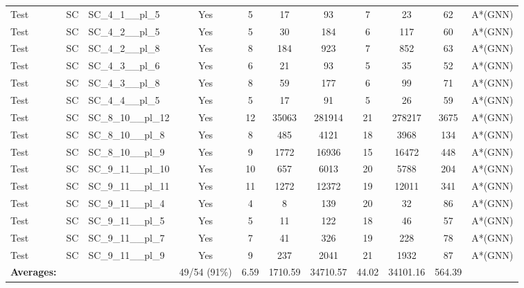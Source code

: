 \documentclass{article}
\begin{document}
\begin{tabular}{lllcccccccc}
Test & SC & SC\_4\_1\_\_pl\_5 & Yes & 5 & 17 & 93 & 7 & 23 & 62 & A*(GNN) \\
Test & SC & SC\_4\_2\_\_pl\_5 & Yes & 5 & 30 & 184 & 6 & 117 & 60 & A*(GNN) \\
Test & SC & SC\_4\_2\_\_pl\_8 & Yes & 8 & 184 & 923 & 7 & 852 & 63 & A*(GNN) \\
Test & SC & SC\_4\_3\_\_pl\_6 & Yes & 6 & 21 & 93 & 5 & 35 & 52 & A*(GNN) \\
Test & SC & SC\_4\_3\_\_pl\_8 & Yes & 8 & 59 & 177 & 6 & 99 & 71 & A*(GNN) \\
Test & SC & SC\_4\_4\_\_pl\_5 & Yes & 5 & 17 & 91 & 5 & 26 & 59 & A*(GNN) \\
Test & SC & SC\_8\_10\_\_pl\_12 & Yes & 12 & 35063 & 281914 & 21 & 278217 & 3675 & A*(GNN) \\
Test & SC & SC\_8\_10\_\_pl\_8 & Yes & 8 & 485 & 4121 & 18 & 3968 & 134 & A*(GNN) \\
Test & SC & SC\_8\_10\_\_pl\_9 & Yes & 9 & 1772 & 16936 & 15 & 16472 & 448 & A*(GNN) \\
Test & SC & SC\_9\_11\_\_pl\_10 & Yes & 10 & 657 & 6013 & 20 & 5788 & 204 & A*(GNN) \\
Test & SC & SC\_9\_11\_\_pl\_11 & Yes & 11 & 1272 & 12372 & 19 & 12011 & 341 & A*(GNN) \\
Test & SC & SC\_9\_11\_\_pl\_4 & Yes & 4 & 8 & 139 & 20 & 32 & 86 & A*(GNN) \\
Test & SC & SC\_9\_11\_\_pl\_5 & Yes & 5 & 11 & 122 & 18 & 46 & 57 & A*(GNN) \\
Test & SC & SC\_9\_11\_\_pl\_7 & Yes & 7 & 41 & 326 & 19 & 228 & 78 & A*(GNN) \\
Test & SC & SC\_9\_11\_\_pl\_9 & Yes & 9 & 237 & 2041 & 21 & 1932 & 87 & A*(GNN) \\
\textbf{Averages:} & & & 49/54 (91\%) & 6.59 & 1710.59 & 34710.57 & 44.02 & 34101.16 & 564.39 & \\
\bottomrule
\end{tabular}
\newpage
\end{document}
